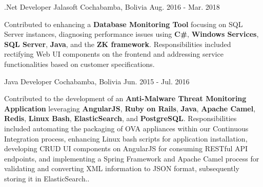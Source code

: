 \begin{cventries}
{\begin{cvitems}
      \end{cvitems} 
    }
  \cventry
    {.Net Developer}
    {Jalasoft}
    {Cochabamba, Bolivia}
    {Aug. 2016 - Mar. 2018}
    {
      \begin{cvitems}
        \item {Contributed to enhancing a \textbf{Database Monitoring Tool} focusing on SQL Server instances, diagnosing performance issues using \textbf{C\#}, \textbf{Windows Services}, \textbf{SQL Server}, \textbf{Java}, and the \textbf{ZK framework}. Responsibilities included rectifying Web UI components on the frontend and addressing service functionalities based on customer specifications.}
      \end{cvitems} 
    }
  \cventry
    {Java Developer}
    {}
    {Cochabamba, Bolivia}
    {Jun. 2015 - Jul. 2016}
    {
      \begin{cvitems}
        \item {Contributed to the development of an \textbf{Anti-Malware Threat Monitoring Application} leveraging \textbf{AngularJS}, \textbf{Ruby on Rails}, \textbf{Java}, \textbf{Apache Camel}, \textbf{Redis}, \textbf{Linux Bash}, \textbf{ElasticSearch}, and \textbf{PostgreSQL}. Responsibilities included automating the packaging of OVA appliances within our Continuous Integration process, enhancing Linux bash scripts for application installation, developing CRUD UI components on AngularJS for consuming RESTful API endpoints, and implementing a Spring Framework and Apache Camel process for validating and converting XML information to JSON format, subsequently storing it in ElasticSearch..}
      \end{cvitems}
    }


\end{cventries}
